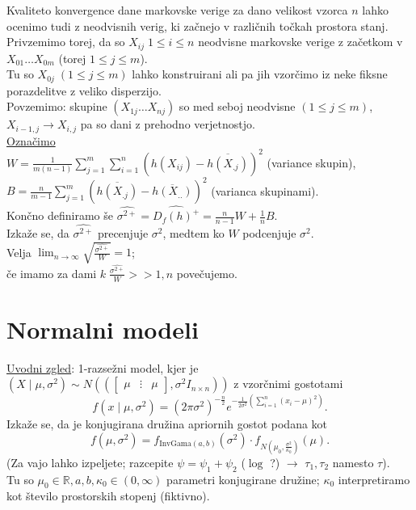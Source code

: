 \documentclass[a4paper, 12pt]{book}
\theoremstyle{definition}
\theoremstyle{remark}
\newcommand{\R}{\mathbb{R}}
\begin{document}
Kvaliteto konvergence dane markovske verige za dano velikost vzorca $n$ lahko ocenimo tudi z  neodvisnih verig,
ki začnejo v  različnih točkah prostora stanj. \\
Privzemimo torej, da so $X_{ij}\; 1 \leq i \leq n$ neodvisne markovske verige z začetkom v $X_{01} \dots X_{0m}$
(torej $1 \leq j \leq m$). \\
Tu so $X_{0j} \; (1 \leq j \leq m)$ lahko konstruirani  ali pa jih vzorčimo iz neke fiksne porazdelitve z veliko disperzijo. \\
Povzemimo: skupine $(X_{1j} \dots X_{nj})$ so med seboj neodvisne $(1 \leq j \leq m)$, \\
$X_{i-1,j} \to X_{i,j}$ pa so dani z prehodno verjetnostjo. \\
\underline{Označimo} \\
$W = \frac{1}{m(n-1)} \sum_{j=1}^{m} \sum_{i=1}^{n} \left(h(X_{ij}) - \overline{h(X_{.j})}\right)^2$
(variance  skupin), \\
$B = \frac{n}{m-1} \sum_{j=1}^{m} \left(\overline{h(X_{.j})} - \overline{h(X_{..})}\right)^2$
(varianca  skupinami). \\
Končno definiramo še $\widehat{\sigma^{2+}} = \widehat{D_f(h)^{+}} = \frac{n}{n-1} W + \frac{1}{n} B$. \\
Izkaže se, da $\widehat{\sigma^{2+}}$ precenjuje $\sigma^2$, medtem ko $W$ podcenjuje $\sigma^2$. \\
Velja $\lim_{n \to \infty} \sqrt{\frac{\widehat{\sigma^{2+}}}{W}} = 1$; \\
če imamo za dami $k \; \frac{\widehat{\sigma^{2+}}}{W} >> 1, n$ povečujemo.



\chapter{Normalni modeli}


\underline{Uvodni zgled}: 1-razsežni  model, kjer je
$(X \mid \mu, \sigma^2) \sim N(\left(\begin{bmatrix}\mu & \vdots & \mu\end{bmatrix}, \sigma^2 I_{n \times n}\right))$
z vzorčnimi gostotami
\begin{equation}
  f(x \mid \mu, \sigma^2) = \left(2 \pi \sigma^2\right)^{-\frac{n}{2}} e^{-\frac{1}{2 \sigma^2} \left(\sum_{i=1}^{n} (x_i-\mu)^2\right)}.
  \label{normalni-gostota-x}
\end{equation}
Izkaže se, da je konjugirana družina apriornih gostot podana kot
\begin{equation}
  f(\mu, \sigma^2) = f_{\text{InvGama}(a,b)}(\sigma^2) \cdot f_{N\left(\mu_0, \frac{\sigma^2}{\kappa_0}\right)}(\mu).
  \label{normalni-apriorna}
\end{equation}
(Za vajo lahko izpeljete; razcepite $\psi = \psi_1 + \psi_2$ ($\log$ ?) $\to$ $\tau_1, \tau_2$ namesto $\tau$). \\
Tu so $\mu_0 \in \R, a, b, \kappa_0 \in (0, \infty)$ parametri konjugirane družine;
$\kappa_0$ interpretiramo kot število prostorskih stopenj (fiktivno).
\end{document}
